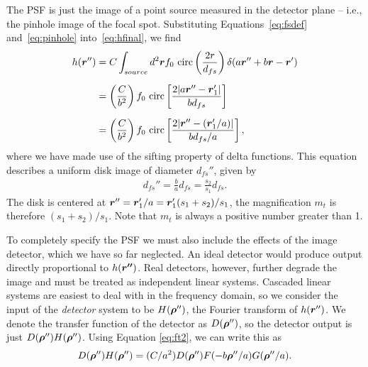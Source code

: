 \documentclass[mphy386-notes.tex]{subfiles}
\begin{document}
The PSF is just the image of a point source measured in the detector plane --
i.e., the pinhole image of the focal spot. Substituting Equations~\ref{eq:fsdef}
and~\ref{eq:pinhole} into~\ref{eq:hfinal}, we find
\begin{align}
  h(\boldsymbol{r}'') &= C \int_{source} d^2\boldsymbol{r} f_0 \text{ circ} \left(\frac{2r}{d_{fs}}\right)\delta(a\boldsymbol{r}'' + b\boldsymbol{r}-\boldsymbol{r}')\nonumber\\[6pt]
              &= \left(\frac{C}{b^2}\right) f_0 \text{ circ}\left[\frac{2|a\boldsymbol{r}'' - \boldsymbol{r}_1'|}{bd_{fs}}\right]\nonumber\\[6pt]
              &= \left(\frac{C}{b^2}\right) f_0 \text{ circ}\left[\frac{2|\boldsymbol{r}''-(\boldsymbol{r}_1'/a)|}{b d_{fs} / a}\right],
\end{align}
where we have made use of the sifting property of delta functions. This equation
describes a uniform disk image of diameter $d_{fs}''$, given by
\begin{align}
  d_{fs}'' = \frac{b}{a}d_{fs} = \frac{s_2}{s_1}d_{fs}.
\end{align}
The disk is centered at $\boldsymbol{r}'' = \boldsymbol{r}_1'/a = \boldsymbol{r}_1'(s_1 + s_2)/s_1$, the
magnification $m_t$ is therefore $(s_1 + s_2)/s_1$. Note that $m_t$ is always a positive number greater than 1.

To completely specify the PSF we must also include the effects of the image
detector, which we have so far neglected. An ideal detector would produce output
directly proportional to $h(\boldsymbol{r''})$. Real detectors, however, further degrade
the image and must be treated as independent linear systems. Cascaded linear
systems are easiest to deal with in the frequency domain, so we consider the
input of the \textit{detector} system to be $H(\boldsymbol{\rho}'')$, the
Fourier transform of $h(\boldsymbol{r}'')$. We denote the transfer function of
the detector as $D(\boldsymbol{\rho}'')$, so the detector output is just
$D(\boldsymbol{\rho}'')H(\boldsymbol{\rho}'')$. Using Equation \ref{eq:ft2}, we can write this
as
\begin{align}
  D(\boldsymbol{\rho}'')H(\boldsymbol{\rho}'') = (C/a^2)D(\boldsymbol{\rho}'')F(-b\boldsymbol{\rho}''/a)G(\boldsymbol{\rho}''/a).
\end{align}
\end{document}

